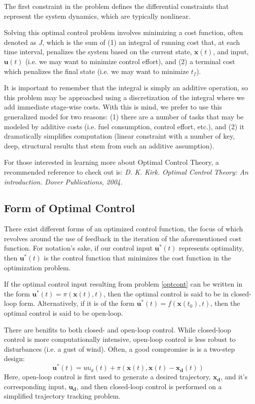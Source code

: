 ﻿\documentclass[twoside]{article}
\begin{document}
The first constraint in the problem defines the differential constraints that represent the system dynamics, which are typically nonlinear.

Solving this optimal control problem involves minimizing a cost function, often denoted as $J$, which is the sum of (1) an integral of running cost that, at each time interval, penalizes the system based on the current state, $\boldsymbol{x}(t)$, and input, $\boldsymbol{u}(t)$ (i.e. we may want to minimize control effort), and (2) a terminal cost which penalizes the final state (i.e. we may want to minimize $t_f$). 

It is important to remember that the integral is simply an additive operation, so this problem may be approached using a discretization of the integral where we add immediate stage-wise costs. With this is mind, we prefer to use this generalized model for two reasons: (1) there are a number of tasks that may be modeled by additive costs (i.e. fuel consumption, control effort, etc.), and (2) it dramatically simplifies computation (linear constraint with a number of key, deep, structural results that stem from such an additive assumption).

For those interested in learning more about Optimal Control Theory, a recommended reference to check out is: \textit{D. K. Kirk. Optimal Control Theory: An introduction. Dover Publications, 2004.}

\subsection{Form of Optimal Control}

There exist different forms of an optimized control function, the focus of which revolves around the use of feedback in the iteration of the aforementioned cost function. For notation's sake, if our control input $\mathbf{u}^*(t)$ represents optimality, then $\mathbf{u}^*(t)$ is the control function that minimizes the cost function in the optimization problem. 

If the optimal control input resulting from problem \ref{optcont} can be written in the form $\mathbf{u}^*(t) = \pi(\mathbf{x}(t),t)$, then the optimal control is said to be in closed-loop form. Alternatively, if it is of the form $\mathbf{u}^*(t) = f(\mathbf{x}(t_0),t)$, then the optimal control is said to be open-loop. 

There are benifits to both closed- and open-loop control. While closed-loop control is more computationally intensive, open-loop control is less robust to disturbances (i.e. a gust of wind). Often, a good compromise is is a two-step design:  
$$\mathbf{u}^*(t) = u\mathbb{u_d}(t) + \pi(\mathbf{x}(t),\mathbf{x}(t) - \mathbf{x_d}(t))$$
Here, open-loop control is first used to generate a desired trajectory, $\mathbf{x_d}$, and it's corresponding input, $\mathbf{u_d}$, and then closed-loop control is performed on a simplified trajectory tracking problem.
\end{document}
